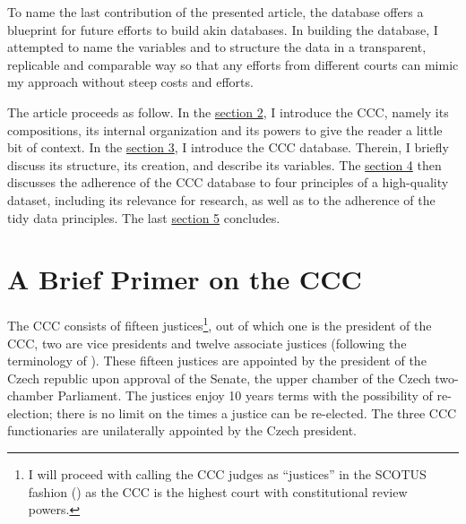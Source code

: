 \documentclass[
  11pt,
]{article}
\begin{document}
To name the last contribution of the presented article, the database offers a blueprint for future efforts to build akin databases. In building the database, I attempted to name the variables and to structure the data in a transparent, replicable and comparable way so that any efforts from different courts can mimic my approach without steep costs and efforts.

The article proceeds as follow. In the \hyperref[primer]{section 2}, I introduce the CCC, namely its compositions, its internal organization and its powers to give the reader a little bit of context. In the \hyperref[database]{section 3}, I introduce the CCC database. Therein, I briefly discuss its structure, its creation, and describe its variables. The \hyperref[principles]{section 4} then discusses the adherence of the CCC database to four principles of a high-quality dataset, including its relevance for research, as well as to the adherence of the tidy data principles. The last \hyperref[conclusion]{section 5} concludes.

\section{A Brief Primer on the CCC}\label{primer}

The CCC consists of fifteen justices\footnote{I will proceed with calling the CCC judges as ``justices'' in the SCOTUS fashion () as the CCC is the highest court with constitutional review
  powers.}, out of which one is the president of the CCC, two are vice presidents and twelve associate justices (following the terminology of ). These fifteen justices are appointed by the president of the Czech republic upon approval of the Senate, the upper chamber of the Czech two-chamber Parliament. The justices enjoy 10 years terms with the possibility of re-election; there is no limit on the times a justice can be re-elected. The three CCC functionaries are unilaterally appointed by the Czech president.
\end{document}
